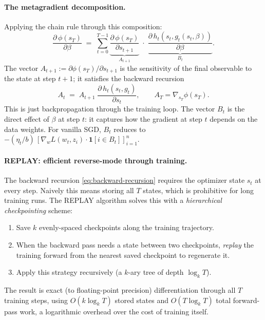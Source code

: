 \documentclass[11pt]{article}
\begin{document}
\paragraph{The metagradient decomposition.} Applying the chain rule through this composition:
\begin{equation}\label{eq:metagrad-decomp}
  \frac{\partial\,\phi(s_T)}{\partial \beta} \;=\; \sum_{t=0}^{T-1}\underbrace{\frac{\partial\,\phi(s_T)}{\partial s_{t+1}}}_{A_{t+1}}\;\cdot\;\underbrace{\frac{\partial\,h_t(s_t,g_t(s_t,\beta))}{\partial \beta}}_{B_t}.
\end{equation}
The vector $A_{t+1} := \partial\phi(s_T)/\partial s_{t+1}$ is the sensitivity of the final observable to the state at step $t+1$; it satisfies the backward recursion
\begin{equation}\label{eq:backward-recursion}
  A_t \;=\; A_{t+1}\;\frac{\partial\,h_t(s_t,g_t)}{\partial s_t}, \qquad A_T = \nabla_{s_T}\phi(s_T).
\end{equation}
This is just backpropagation through the training loop. The vector $B_t$ is the direct effect of $\beta$ at step $t$: it captures how the gradient at step $t$ depends on the data weights. For vanilla SGD, $B_t$ reduces to $-(\eta_t/b)\,[\nabla_w L(w_t,z_i)\cdot\mathbf{1}[i\in B_t]]_{i=1}^n$.

\paragraph{REPLAY: efficient reverse-mode through training.} The backward recursion \eqref{eq:backward-recursion} requires the optimizer state $s_t$ at every step. Naively this means storing all $T$ states, which is prohibitive for long training runs. The REPLAY algorithm \citep{engstrom2025optimizing} solves this with a \emph{hierarchical checkpointing} scheme:
\begin{enumerate}
  \item Save $k$ evenly-spaced checkpoints along the training trajectory.
  \item When the backward pass needs a state between two checkpoints, \emph{replay} the training forward from the nearest saved checkpoint to regenerate it.
  \item Apply this strategy recursively (a $k$-ary tree of depth $\log_k T$).
\end{enumerate}
The result is exact (to floating-point precision) differentiation through all $T$ training steps, using $O(k\log_k T)$ stored states and $O(T\log_k T)$ total forward-pass work, a logarithmic overhead over the cost of training itself.
\end{document}

